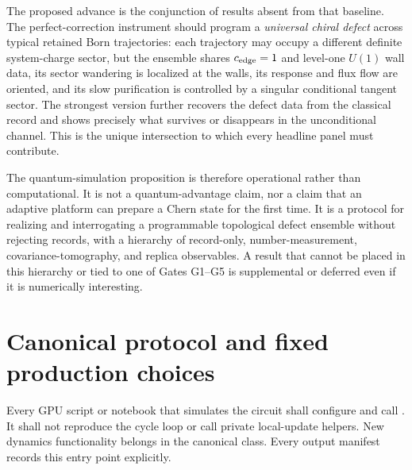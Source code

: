 \documentclass[aps,prx,onecolumn,nofootinbib,superscriptaddress,longbibliography]{revtex4-2}
\begin{document}
The proposed advance is the conjunction of results absent from that baseline.  The
perfect-correction instrument should program a \emph{universal chiral defect} across
typical retained Born trajectories: each trajectory may occupy a different definite
system-charge sector, but the ensemble shares $c_{\rm edge}=1$ and level-one $U(1)$ wall data,
its sector wandering is localized at the walls, its response and flux flow are oriented,
and its slow purification is controlled by a singular conditional tangent sector.  The
strongest version further recovers the defect data from the classical record and shows
precisely what survives or disappears in the unconditional channel.  This is the unique
intersection to which every headline panel must contribute.

The quantum-simulation proposition is therefore operational rather than computational.
It is not a quantum-advantage claim, nor a claim that an adaptive platform can prepare a
Chern state for the first time.  It is a protocol for realizing and interrogating a
programmable topological defect ensemble without rejecting records, with a hierarchy of
record-only, number-measurement, covariance-tomography, and replica observables.  A result
that cannot be placed in this hierarchy or tied to one of Gates G1--G5 is supplemental or
deferred even if it is numerically interesting.

\section{Canonical protocol and fixed production choices}

Every GPU script or notebook that simulates the circuit shall configure and call
.  It shall not reproduce the cycle loop or
call private local-update helpers.  New dynamics functionality belongs in the canonical
class.  Every output manifest records this entry point explicitly.
\end{document}

